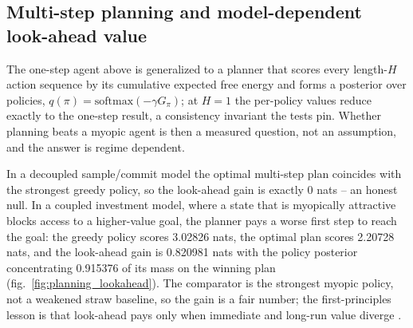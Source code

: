 \documentclass[
  english,
]{article}
\begin{document}
\subsection{Multi-step planning and model-dependent look-ahead
value}\label{multi-step-planning-and-model-dependent-look-ahead-value}

The one-step agent above is generalized to a planner that scores every
length-\(H\) action sequence by its cumulative expected free energy and
forms a posterior over policies,
\(q(\pi)=\mathrm{softmax}(-\gamma G_\pi)\); at \(H=1\) the per-policy
values reduce exactly to the one-step result, a consistency invariant
the tests pin. Whether planning beats a myopic agent is then a measured
question, not an assumption, and the answer is regime dependent.

In a decoupled sample/commit model the optimal multi-step plan coincides
with the strongest greedy policy, so the look-ahead gain is exactly 0
nats -- an honest null. In a coupled investment model, where a state
that is myopically attractive blocks access to a higher-value goal, the
planner pays a worse first step to reach the goal: the greedy policy
scores 3.02826 nats, the optimal plan scores 2.20728 nats, and the
look-ahead gain is 0.820981 nats with the policy posterior concentrating
0.915376 of its mass on the winning plan
(fig.~\ref{fig:planning_lookahead}). The comparator is the strongest
myopic policy, not a weakened straw baseline, so the gain is a fair
number; the first-principles lesson is that look-ahead pays only when
immediate and long-run value diverge
\citep{parr2022active, dacosta2020synthesis}.
\end{document}
